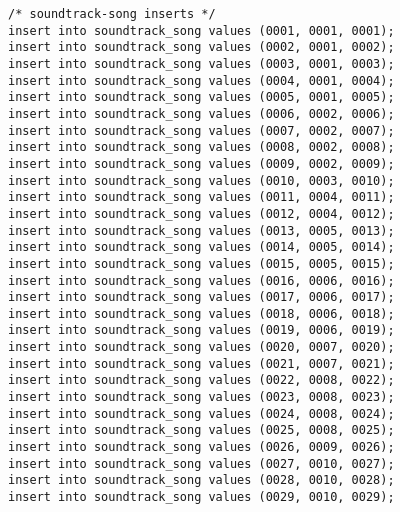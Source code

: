\documentclass[12pt]{article}
\begin{document}
\begin{lstlisting}
/* soundtrack-song inserts */
insert into soundtrack_song values (0001, 0001, 0001);
insert into soundtrack_song values (0002, 0001, 0002);
insert into soundtrack_song values (0003, 0001, 0003);
insert into soundtrack_song values (0004, 0001, 0004);
insert into soundtrack_song values (0005, 0001, 0005);
insert into soundtrack_song values (0006, 0002, 0006);
insert into soundtrack_song values (0007, 0002, 0007);
insert into soundtrack_song values (0008, 0002, 0008);
insert into soundtrack_song values (0009, 0002, 0009);
insert into soundtrack_song values (0010, 0003, 0010);
insert into soundtrack_song values (0011, 0004, 0011);
insert into soundtrack_song values (0012, 0004, 0012);
insert into soundtrack_song values (0013, 0005, 0013);
insert into soundtrack_song values (0014, 0005, 0014);
insert into soundtrack_song values (0015, 0005, 0015);
insert into soundtrack_song values (0016, 0006, 0016);
insert into soundtrack_song values (0017, 0006, 0017);
insert into soundtrack_song values (0018, 0006, 0018);
insert into soundtrack_song values (0019, 0006, 0019);
insert into soundtrack_song values (0020, 0007, 0020);
insert into soundtrack_song values (0021, 0007, 0021);
insert into soundtrack_song values (0022, 0008, 0022);
insert into soundtrack_song values (0023, 0008, 0023);
insert into soundtrack_song values (0024, 0008, 0024);
insert into soundtrack_song values (0025, 0008, 0025);
insert into soundtrack_song values (0026, 0009, 0026);
insert into soundtrack_song values (0027, 0010, 0027);
insert into soundtrack_song values (0028, 0010, 0028);
insert into soundtrack_song values (0029, 0010, 0029);







\end{lstlisting}
\end{document}
